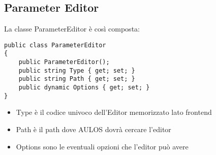 \subsection{Parameter Editor}
La classe ParameterEditor è così composta:
\begin{lstlisting}[caption={ParameterEditor.cs},style=sharpCode]
public class ParameterEditor
{
    public ParameterEditor();
    public string Type { get; set; }
    public string Path { get; set; }
    public dynamic Options { get; set; }
}
\end{lstlisting}
\begin{itemize}
\item Type è il codice univoco dell'Editor memorizzato lato frontend
\item Path è il path dove AULOS dovrà cercare l'editor
\item Options sono le eventuali opzioni che l'editor può avere
\end{itemize}


